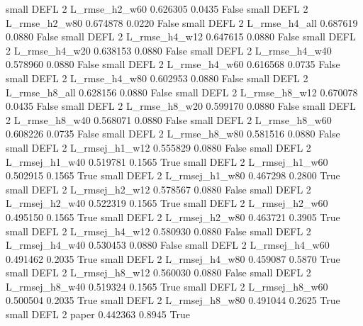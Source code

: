      small     DEFL                 2  L_rmse_h2_w60   0.626305      0.0435   False
     small     DEFL                 2  L_rmse_h2_w80   0.674878      0.0220   False
     small     DEFL                 2  L_rmse_h4_all   0.687619      0.0880   False
     small     DEFL                 2  L_rmse_h4_w12   0.647615      0.0880   False
     small     DEFL                 2  L_rmse_h4_w20   0.638153      0.0880   False
     small     DEFL                 2  L_rmse_h4_w40   0.578960      0.0880   False
     small     DEFL                 2  L_rmse_h4_w60   0.616568      0.0735   False
     small     DEFL                 2  L_rmse_h4_w80   0.602953      0.0880   False
     small     DEFL                 2  L_rmse_h8_all   0.628156      0.0880   False
     small     DEFL                 2  L_rmse_h8_w12   0.670078      0.0435   False
     small     DEFL                 2  L_rmse_h8_w20   0.599170      0.0880   False
     small     DEFL                 2  L_rmse_h8_w40   0.568071      0.0880   False
     small     DEFL                 2  L_rmse_h8_w60   0.608226      0.0735   False
     small     DEFL                 2  L_rmse_h8_w80   0.581516      0.0880   False
     small     DEFL                 2 L_rmsej_h1_w12   0.555829      0.0880   False
     small     DEFL                 2 L_rmsej_h1_w40   0.519781      0.1565    True
     small     DEFL                 2 L_rmsej_h1_w60   0.502915      0.1565    True
     small     DEFL                 2 L_rmsej_h1_w80   0.467298      0.2800    True
     small     DEFL                 2 L_rmsej_h2_w12   0.578567      0.0880   False
     small     DEFL                 2 L_rmsej_h2_w40   0.522319      0.1565    True
     small     DEFL                 2 L_rmsej_h2_w60   0.495150      0.1565    True
     small     DEFL                 2 L_rmsej_h2_w80   0.463721      0.3905    True
     small     DEFL                 2 L_rmsej_h4_w12   0.580930      0.0880   False
     small     DEFL                 2 L_rmsej_h4_w40   0.530453      0.0880   False
     small     DEFL                 2 L_rmsej_h4_w60   0.491462      0.2035    True
     small     DEFL                 2 L_rmsej_h4_w80   0.459087      0.5870    True
     small     DEFL                 2 L_rmsej_h8_w12   0.560030      0.0880   False
     small     DEFL                 2 L_rmsej_h8_w40   0.519324      0.1565    True
     small     DEFL                 2 L_rmsej_h8_w60   0.500504      0.2035    True
     small     DEFL                 2 L_rmsej_h8_w80   0.491044      0.2625    True
     small     DEFL                 2          paper   0.442363      0.8945    True
